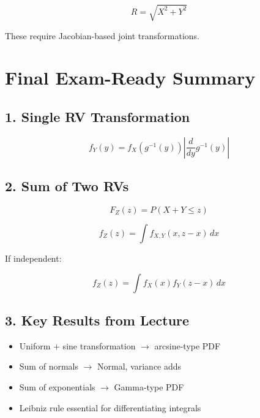 \documentclass[12pt]{article}
\begin{document}
\[
R = \sqrt{X^2 + Y^2}
\]

These require Jacobian-based joint transformations.

\section*{Final Exam-Ready Summary}

\subsection*{1. Single RV Transformation}

\[
f_Y(y)
=
f_X(g^{-1}(y))
\left|
\frac{d}{dy}g^{-1}(y)
\right|
\]

\subsection*{2. Sum of Two RVs}

\[
F_Z(z)
=
P(X+Y \le z)
\]

\[
f_Z(z)
=
\int f_{X,Y}(x,z-x) \, dx
\]

If independent:

\[
f_Z(z)
=
\int f_X(x)f_Y(z-x) \, dx
\]

\subsection*{3. Key Results from Lecture}

\begin{itemize}
\item Uniform + sine transformation $\rightarrow$ arcsine-type PDF
\item Sum of normals $\rightarrow$ Normal, variance adds
\item Sum of exponentials $\rightarrow$ Gamma-type PDF
\item Leibniz rule essential for differentiating integrals
\end{itemize}
\end{document}
